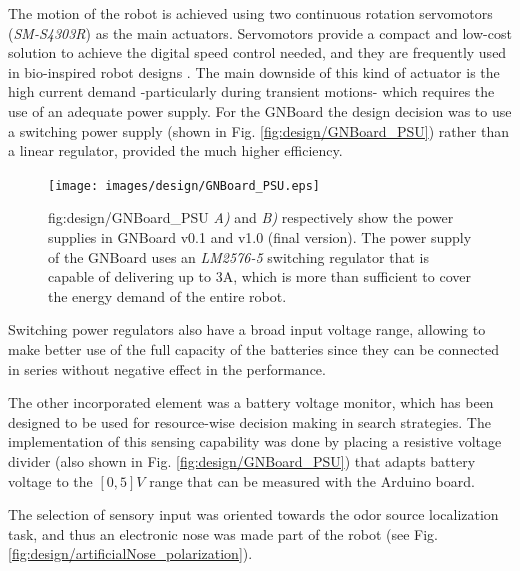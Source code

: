 The motion of the robot is achieved using two continuous rotation servomotors (\emph{SM-S4303R}) as the main actuators. Servomotors provide a compact and low-cost solution to achieve the digital speed control needed, and they are frequently used in bio-inspired robot designs \cite{zamorano2011control,Herrero11,Urziceanu11,MeyerSproewitz06}.
The main downside of this kind of actuator is the high current demand -particularly during transient motions- which requires the use of an adequate power supply. For the GNBoard the design decision was to use a switching power supply (shown in Fig. \ref{fig:design/GNBoard_PSU}) rather than a linear regulator, provided the much higher efficiency.
\begin{figure}[h!]
\centerline{\mbox{\texttt{[image: images/design/GNBoard\_PSU.eps]}}}
{fig:design/GNBoard_PSU}{
\emph{A)} and \emph{B)} respectively show the power supplies in GNBoard v0.1 and v1.0 (final version).
The power supply of the GNBoard uses an \emph{LM2576-5} switching regulator that is capable of delivering up to 3A, which is more than sufficient to cover the energy demand of the entire robot.
}\end{figure}
Switching power regulators also have a broad input voltage range, allowing to make better use of the full capacity of the batteries since they can be connected in series without negative effect in the performance.

The other incorporated element was a battery voltage monitor, which has been designed to be used for resource-wise decision making in search strategies. The implementation of this sensing capability was done by placing a resistive voltage divider (also shown in Fig. \ref{fig:design/GNBoard_PSU}) that adapts battery voltage to the $[0,5]V$ range that can be measured with the Arduino board.


The selection of sensory input was oriented towards the odor source localization task, and thus an electronic nose was made part of the robot (see Fig. \ref{fig:design/artificialNose_polarization}).

